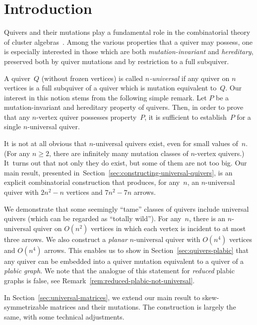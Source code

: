 \section{Introduction}




Quivers and their mutations play a fundamental role in the combinatorial theory of cluster algebras~\cite{FWZ, ca1}. Among the various properties that a quiver may possess, one is especially interested in those which are both \emph{mutation-invariant} and \emph{hereditary}, \ie preserved both by quiver mutations and by restriction to a full subquiver. 

A quiver~$Q$ (without frozen vertices) is called 
\emph{$n$-universal} if any quiver on $n$ vertices is a full subquiver of a quiver which is mutation equivalent to~$Q$. 
Our interest in this notion stems from the following simple remark. Let $P$ be a mutation-invariant and hereditary property of quivers. Then, in order to prove that any $n$-vertex quiver possesses property~$P$, it is sufficient to establish~$P$ for a single $n$-universal quiver. 

It is not at all obvious that $n$-universal quivers exist, even for small values of~$n$. 
(For any $n\ge 2$, there are infinitely many mutation classes of $n$-vertex quivers.) 
It~turns out that not only they do exist, but some of them are not too big. 
Our main result, presented in~Section~\ref{sec:constructing-universal-quivers}, is an explicit combinatorial construction that produces, for any~$n$, an $n$-universal quiver with $2n^2-n$ vertices and $7n^2-7n$ arrows. 

We demonstrate that some seemingly ``tame'' classes of quivers include universal quivers (which can be regarded as ``totally wild''). 
For any~$n$, there is an $n$-universal quiver on $O(n^2)$ vertices in which each vertex is incident to at most three arrows. 
We also construct a \emph{planar} $n$-universal quiver with $O(n^4)$ vertices and $O(n^4)$ arrows. 
This enables us to show in Section~\ref{sec:quivers-plabic} that any quiver can be embedded 
into a quiver mutation equivalent to a quiver of a \emph{plabic graph}. 
We note that the analogue of this statement for \emph{reduced} plabic graphs is false, 
see Remark~\ref{rem:reduced-plabic-not-universal}. 

In Section~\ref{sec:universal-matrices}, we extend our main result to skew-symmetrizable matrices and their mutations. The construction is largely the same, with some technical adjustments. 

